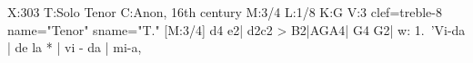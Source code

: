 X:303
T:Solo Tenor
C:Anon, 16th century
M:3/4
L:1/8
K:G
V:3 clef=treble-8 name="Tenor" sname="T."
[M:3/4] d4 e2| d2c2 > B2|AGA4| G4 G2|
w: 1.~'Vi-da | de la * | vi - da | mi-a,
